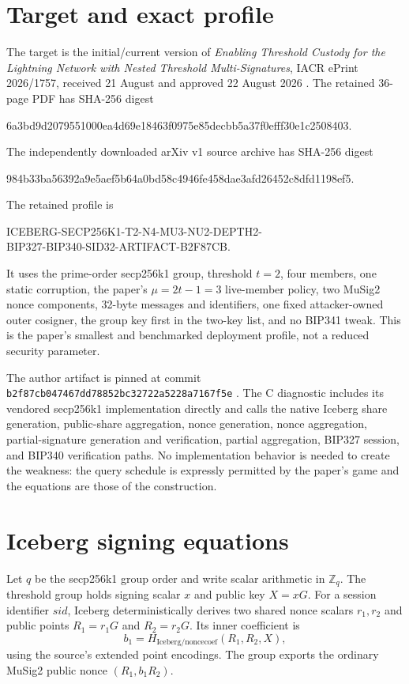\documentclass[10pt,a4paper]{article}
\newcommand{\Zq}{\mathbb{Z}_q}
\begin{document}
\section{Target and exact profile}

The target is the initial/current version of \emph{Enabling Threshold Custody
for the Lightning Network with Nested Threshold Multi-Signatures}, IACR ePrint
2026/1757, received 21 August and approved 22 August 2026
\cite{iceberg}. The retained 36-page PDF has SHA-256 digest
\begin{center}
\small\ttfamily
6a3bd9d2079551000ea4d69e18463f0975e85decbb5a37f0efff30e1c2508403.
\end{center}
The independently downloaded arXiv v1 source archive has SHA-256 digest
\begin{center}
\small\ttfamily
984b33ba56392a9e5aef5b64a0bd58c4946fe458dae3afd26452c8dfd1198ef5.
\end{center}

The retained profile is
\begin{center}
\small\ttfamily
ICEBERG-SECP256K1-T2-N4-MU3-NU2-DEPTH2-\\
BIP327-BIP340-SID32-ARTIFACT-B2F87CB.
\end{center}
It uses the prime-order secp256k1 group, threshold $t=2$, four members, one
static corruption, the paper's $\mu=2t-1=3$ live-member policy, two MuSig2
nonce components, 32-byte messages and identifiers, one fixed attacker-owned
outer cosigner, the group key first in the two-key list, and no BIP341 tweak.
This is the paper's smallest and benchmarked deployment profile, not a reduced
security parameter.

The author artifact is pinned at commit
\texttt{b2f87cb047467dd78852bc32722a5228a7167f5e} \cite{artifact}. The C
diagnostic includes its vendored secp256k1 implementation directly and calls
the native Iceberg share generation, public-share aggregation, nonce
generation, nonce aggregation, partial-signature generation and verification,
partial aggregation, BIP327 session, and BIP340 verification paths. No
implementation behavior is needed to create the weakness: the query schedule
is expressly permitted by the paper's game and the equations are those of the
construction.

\section{Iceberg signing equations}

Let $q$ be the secp256k1 group order and write scalar arithmetic in $\Zq$.
The threshold group holds signing scalar $x$ and public key $X=xG$. For a
session identifier $\mathit{sid}$, Iceberg deterministically derives two
shared nonce scalars $r_1,r_2$ and public points $R_1=r_1G$ and $R_2=r_2G$.
Its inner coefficient is
\[
 b_1=H_{\mathrm{Iceberg/noncecoef}}(R_1,R_2,X),
\]
using the source's extended point encodings. The group exports the ordinary
MuSig2 public nonce $(R_1,b_1R_2)$.
\end{document}
